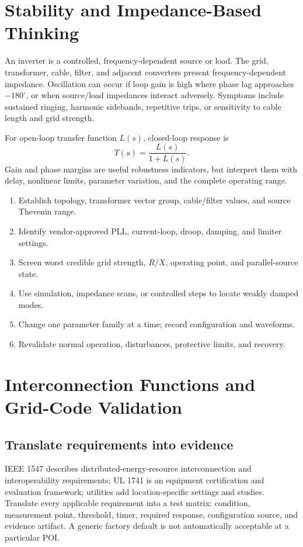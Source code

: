 \documentclass[11pt]{article}
\begin{document}
\section{Stability and Impedance-Based Thinking}

An inverter is a controlled, frequency-dependent source or load. The grid,
transformer, cable, filter, and adjacent converters present frequency-dependent
impedance. Oscillation can occur if loop gain is high where phase lag approaches
$-180^\circ$, or when source/load impedances interact adversely. Symptoms
include sustained ringing, harmonic sidebands, repetitive trips, or sensitivity
to cable length and grid strength.

For open-loop transfer function $L(s)$, closed-loop response is
\[
T(s)=\frac{L(s)}{1+L(s)}.
\]
Gain and phase margins are useful robustness indicators, but interpret them with
delay, nonlinear limits, parameter variation, and the complete operating range.

\begin{enumerate}
\item Establish topology, transformer vector group, cable/filter values, and source Thevenin range.
\item Identify vendor-approved PLL, current-loop, droop, damping, and limiter settings.
\item Screen worst credible grid strength, $R/X$, operating point, and parallel-source state.
\item Use simulation, impedance scans, or controlled steps to locate weakly damped modes.
\item Change one parameter family at a time; record configuration and waveforms.
\item Revalidate normal operation, disturbances, protective limits, and recovery.
\end{enumerate}

\section{Interconnection Functions and Grid-Code Validation}

\subsection{Translate requirements into evidence}
IEEE 1547 describes distributed-energy-resource interconnection and
interoperability requirements; UL 1741 is an equipment certification and
evaluation framework; utilities add location-specific settings and studies.
Translate every applicable requirement into a test matrix: condition,
measurement point, threshold, timer, required response, configuration source,
and evidence artifact. A generic factory default is not automatically acceptable
at a particular POI.
\end{document}
